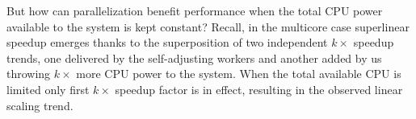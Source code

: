 But how can parallelization benefit performance when the total CPU power available to the system is kept constant? Recall, in the multicore case superlinear speedup emerges thanks to the superposition of two independent $k\times$ speedup trends, one delivered by the self-adjusting workers and another added by us throwing $k\times$ more CPU power to the system. When the total available CPU is limited only first $k\times$ speedup factor is in effect, resulting in the observed linear scaling trend.


%





